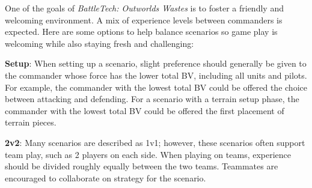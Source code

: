 One of the goals of \emph{BattleTech: Outworlds Wastes} is to foster a friendly and welcoming environment.
A mix of experience levels between commanders is expected.
Here are some options to help balance scenarios so game play is welcoming while also staying fresh and challenging:

\begin{description}

\item {\bfseries Setup}: When setting up a scenario, slight preference should generally be given to the commander whose force has the lower total BV, including all units and pilots.
For example, the commander with the lowest total BV could be offered the choice between attacking and defending.
For a scenario with a terrain setup phase, the commander with the lowest total BV could be offered the first placement of terrain pieces.

\item {\bfseries 2v2}: Many scenarios are described as 1v1; however, these scenarios often support team play, such as 2 players on each side.
When playing on teams, experience should be divided roughly equally between the two teams.
Teammates are encouraged to collaborate on strategy for the scenario.

\end{description}

